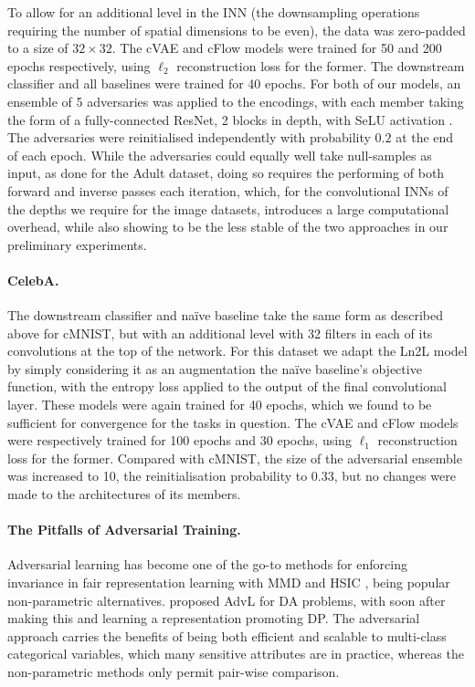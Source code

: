 To allow for an additional level in the \ac{INN} (the downsampling operations requiring the number
of spatial dimensions to be even), the data was zero-padded to a size of $32\times32$. 
%
The \ac{cVAE} and \ac{cFlow} models were trained for 50 and 200 epochs respectively, using $\ell_2$
reconstruction loss for the former. The downstream classifier and all baselines were trained for 40
epochs. 
%
For both of our models, an ensemble of 5 adversaries was applied to the encodings, with each member
taking the form of a fully-connected ResNet, 2 blocks in depth, with SeLU activation
\citep{klambauer2017self}.
%
The adversaries were reinitialised independently with probability $0.2$ at the end of each epoch.
%
While the adversaries could equally well take  null-samples as input, as done for the Adult
dataset, doing so requires the performing of both forward and inverse passes each iteration, which,
for the convolutional \acp{INN} of the depths we require for the image datasets, introduces a large
computational overhead, while also showing to be the less stable of the two approaches in our
preliminary experiments.

\paragraph{CelebA.} The downstream classifier and na\"ive baseline take the same form as described
above for cMNIST, but with an additional level with 32 filters in each of its convolutions at the
top of the network. 
%
For this dataset we adapt the Ln2L model by simply considering it as an augmentation the na\"ive
baseline's objective function, with the entropy loss applied to the output of the final
convolutional layer. 
%
These models were again trained for 40 epochs, which we found to be sufficient for convergence for
the tasks in question. 
%
The \ac{cVAE} and \ac{cFlow} models were respectively trained for 100 epochs and 30 epochs, using $\ell_1$
reconstruction loss for the former. 
%
Compared with cMNIST, the size of the adversarial ensemble was increased to 10, the
reinitialisation probability to 0.33, but no changes were made to the architectures of its members.

\paragraph{The Pitfalls of Adversarial Training.}
%
Adversarial learning has become one of the go-to methods for enforcing invariance in fair
representation learning \citep{ganin2016domain} with \ac{MMD} \citep{louizos2016variational} and HSIC
\citep{QuaShaTho19}, being popular non-parametric alternatives. 
%
\citet{ganin2016domain} proposed \acf{AdvL} for \acf{DA} problems, with
\citet{edwards2016censoring} soon after making this and learning a representation promoting
\ac{DP}. 
%
The adversarial approach carries the benefits of being both efficient and scalable to multi-class
categorical variables, which many sensitive attributes are in practice, whereas the non-parametric
methods only permit pair-wise comparison.

